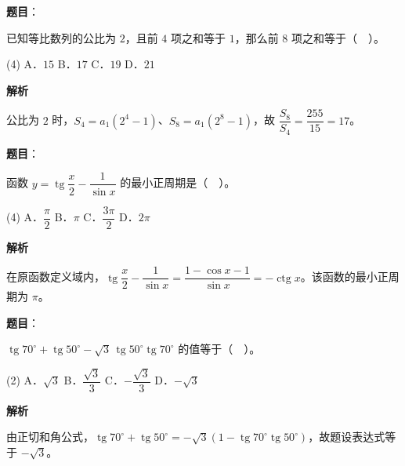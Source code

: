 \begin{answer}

\textbf{题目}：

已知等比数列的公比为 $2$，且前 $4$ 项之和等于 $1$，那么前 $8$ 项之和等于（　）。

\begin{gkopts}(4)
\task A．$15$
\task B．$17$
\task C．$19$
\task D．$21$
\end{gkopts}

\textbf{解析}

公比为 $2$ 时，$S_4=a_1(2^4-1)$、$S_8=a_1(2^8-1)$，故 $\dfrac{S_8}{S_4}=\dfrac{255}{15}=17$。


\end{answer}
\begin{answer}

\textbf{题目}：

函数 $y=\operatorname{tg}\dfrac x2-\dfrac1{\sin x}$ 的最小正周期是（　）。

\begin{gkopts}(4)
\task A．$\dfrac\pi2$
\task B．$\pi$
\task C．$\dfrac{3\pi}2$
\task D．$2\pi$
\end{gkopts}

\textbf{解析}

在原函数定义域内，$\operatorname{tg}\dfrac x2-\dfrac1{\sin x}=\dfrac{1-\cos x-1}{\sin x}=-\operatorname{ctg}x$。该函数的最小正周期为 $\pi$。


\end{answer}
\begin{answer}

\textbf{题目}：

$\operatorname{tg}70^\circ+\operatorname{tg}50^\circ-\sqrt3\,\operatorname{tg}50^\circ\operatorname{tg}70^\circ$ 的值等于（　）。

\begin{gkopts}(2)
\task A．$\sqrt3$
\task B．$\dfrac{\sqrt3}3$
\task C．$-\dfrac{\sqrt3}3$
\task D．$-\sqrt3$
\end{gkopts}

\textbf{解析}

由正切和角公式，$\operatorname{tg}70^\circ+\operatorname{tg}50^\circ=-\sqrt3\left(1-\operatorname{tg}70^\circ\operatorname{tg}50^\circ\right)$，故题设表达式等于 $-\sqrt3$。


\end{answer}
